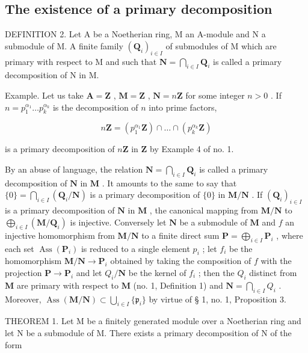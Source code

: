 \subsection{The existence of a primary decomposition}

DEFINITION 2. Let A be a Noetherian ring, M an A-module and N a submodule of M. A finite family \((\mathbf{Q}_i)_{i\in I}\) of submodules of M which are primary with respect to M and such that \(\mathbf{N} = \bigcap_{i\in I}\mathbf{Q}_i\) is called a primary decomposition of N in M.

Example. Let us take \(\mathbf{A} = \mathbf{Z}\) , \(\mathbf{M} = \mathbf{Z}\) , \(\mathbf{N} = n\mathbf{Z}\) for some integer \(n > 0\) . If \(n = p_{1}^{\alpha_1} \ldots p_{k}^{\alpha_k}\) is the decomposition of \(n\) into prime factors,

\[
n \mathbf {Z} = (p _ {1} ^ {\alpha_ {1}} \mathbf {Z}) \cap \dots \cap (p _ {k} ^ {\alpha_ {k}} \mathbf {Z})
\]

is a primary decomposition of \(n\mathbf{Z}\) in \(\mathbf{Z}\) by Example 4 of no. 1.

By an abuse of language, the relation \(\mathbf{N} = \bigcap_{i \in I} \mathbf{Q}_i\) is called a primary decomposition of \(\mathbf{N}\) in \(\mathbf{M}\) . It amounts to the same to say that \(\{0\} = \bigcap_{i \in I} (\mathbf{Q}_i / \mathbf{N})\) is a primary decomposition of \(\{0\}\) in \(\mathbf{M} / \mathbf{N}\) . If \((\mathbf{Q}_i)_{i \in I}\) is a primary decomposition of \(\mathbf{N}\) in \(\mathbf{M}\) , the canonical mapping from \(\mathbf{M} / \mathbf{N}\) to \(\bigoplus_{i \in I} (\mathbf{M} / \mathbf{Q}_i)\) is injective. Conversely let \(\mathbf{N}\) be a submodule of \(\mathbf{M}\) and \(f\) an injective homomorphism from \(\mathbf{M} / \mathbf{N}\) to a finite direct sum \(\mathbf{P} = \bigoplus_{i \in I} \mathbf{P}_i\) , where each set \(\operatorname{Ass}(\mathbf{P}_i)\) is reduced to a single element \(p_i\) ; let \(f_i\) be the homomorphism \(\mathbf{M} / \mathbf{N} \to \mathbf{P}_i\) obtained by taking the composition of \(f\) with the projection \(\mathbf{P} \to \mathbf{P}_i\) and let \(Q_i / \mathbf{N}\) be the kernel of \(f_i\) ; then the \(Q_i\) distinct from \(\mathbf{M}\) are primary with respect to \(\mathbf{M}\) (no. 1, Definition 1) and \(\mathbf{N} = \bigcap_{i \in I} Q_i\) . Moreover, \(\operatorname{Ass}(\mathbf{M} / \mathbf{N}) \subset \bigcup_{i \in I} \{\mathfrak{p}_i\}\) by virtue of § 1, no. 1, Proposition 3.

THEOREM 1. Let M be a finitely generated module over a Noetherian ring and let N be a submodule of M. There exists a primary decomposition of N of the form

